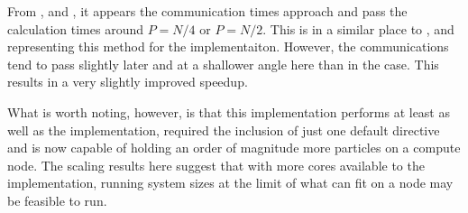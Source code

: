 \vOneSRTimeExplanation
    {}
    {}
    {}
    {\pairoperation{}}
    {\sharedandreplicateddata{}}


%
From
,
 and
,
it appears the communication times approach and pass the calculation
times around $P = N/4$ or $P = N/2$.
%
This is in a similar place to
,
 and
representing this method for the \replicateddata{} implementaiton.
%
However, the communications tend to pass slightly later and at a shallower
angle here than in the \replicateddata{} case.
%
This results in a very slightly improved speedup.

What is worth noting, however, is that this implementation performs
at least as well as the \replicateddata{} implementation, required
the inclusion of just one default \openmp{} directive and
is now capable of holding an order of magnitude more particles on
a compute node.
%
The scaling results here suggest that with more cores available to the
implementation, running system sizes at the limit of what can fit on
a node may be feasible to run.
